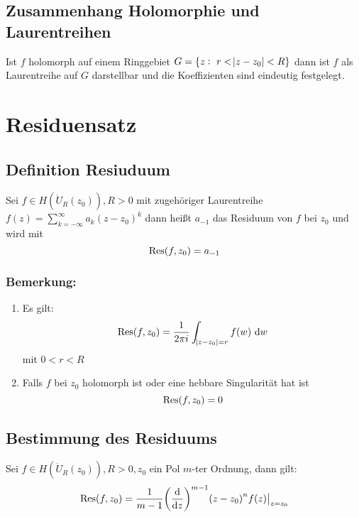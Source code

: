 \subsection{Zusammenhang Holomorphie und Laurentreihen}
Ist $f$ holomorph auf einem Ringgebiet $G = \{z:\ r < \abs{z-z_0} < R\}$ dann ist $f$ als Laurentreihe auf $G$
darstellbar und die Koeffizienten sind eindeutig festgelegt.

\section{Residuensatz}
\subsection{Definition Resiuduum}
Sei $f \in H(\dot{U}_R(z_0)), R>0$ mit zugehöriger Laurentreihe 
$f(z) = \sum_{k=-\infty}^\infty a_k {(z-z_0)}^k$ dann
heißt $a_{-1}$ das Residuum von $f$ bei $z_0$ und wird mit
\begin{equation*}
    \operatorname{Res}(f, z_0) = a_{-1} 
\end{equation*}
\subsubsection{Bemerkung:}
\begin{enumerate}
    \item Es gilt: 
        \begin{equation*}
            \operatorname{Res}(f,z_0) = \frac{1}{2\pi i} 
            \int_{\abs{z-z_0} = r} f(w) \text{ d}w
        \end{equation*}
        mit $0 < r < R$
    \item Falls $f$ bei $z_0$ holomorph ist oder eine
        hebbare Singularität hat ist
        \begin{equation*}
            \operatorname{Res}(f, z_0) = 0 
        \end{equation*}
\end{enumerate}

\subsection{Bestimmung des Residuums}
Sei $f \in H(\dot{U}_R (z_0)), R > 0, z_0$ ein Pol
$m$-ter Ordnung, dann gilt:
\begin{equation*}
    \operatorname{Res}(f, z_0) = \frac{1}{m-1} 
    {\left( \frac{\text{d}}{\text{d}z} \right)}^{m-1}
    {(z-z_0)}^n f(z) \big|_{z=z_0}
\end{equation*}

